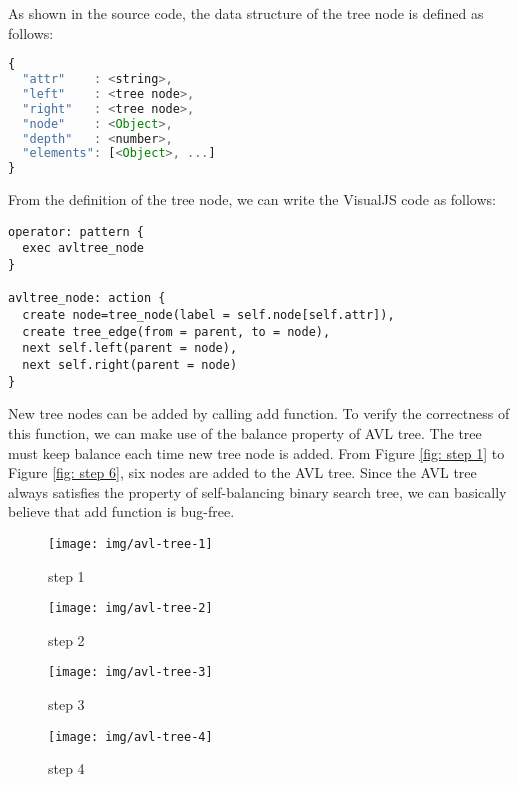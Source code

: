 As shown in the source code, the data structure of the tree node is defined as follows:

\begin{lstlisting}[language=JavaScript]
{
  "attr"    : <string>,
  "left"    : <tree node>,
  "right"   : <tree node>,
  "node"    : <Object>,
  "depth"   : <number>,
  "elements": [<Object>, ...]
}
\end{lstlisting}

From the definition of the tree node, we can write the VisualJS code as follows:

\begin{lstlisting}
operator: pattern {
  exec avltree_node
}

avltree_node: action {
  create node=tree_node(label = self.node[self.attr]),
  create tree_edge(from = parent, to = node),
  next self.left(parent = node),
  next self.right(parent = node)
}
\end{lstlisting}

New tree nodes can be added by calling add function. To verify the correctness of this function, we can make use of the balance property of AVL tree. The tree must keep balance each time new tree node is added. From Figure \ref{fig: step 1} to Figure \ref{fig: step 6}, six nodes are added to the AVL tree. Since the AVL tree always satisfies the property of self-balancing binary search tree, we can basically believe that add function is bug-free.

\begin{figure}
  \begin{minipage}{0.5\hsize}
  \begin{center}
    \texttt{[image: img/avl-tree-1]}
    \caption{step 1}
    \label{fig: step 1}
  \end{center}
  \end{minipage}
  \begin{minipage}{0.5\hsize}
  \begin{center}
    \texttt{[image: img/avl-tree-2]}
    \caption{step 2}
    \label{fig: step 2}
  \end{center}
  \end{minipage}
\end{figure}

\begin{figure}
  \begin{minipage}{0.5\hsize}
  \begin{center}
    \texttt{[image: img/avl-tree-3]}
    \caption{step 3}
    \label{fig: step 3}
  \end{center}
  \end{minipage}
  \begin{minipage}{0.5\hsize}
  \begin{center}
    \texttt{[image: img/avl-tree-4]}
    \caption{step 4}
    \label{fig: step 4}
  \end{center}
  \end{minipage}
\end{figure}

